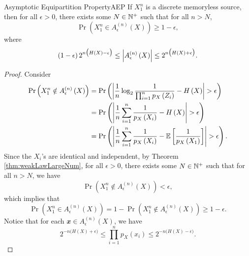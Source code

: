 \documentclass[math]{amznotes}
\theoremstyle{remark}
\begin{document}
\begin{thmbox}{Asymptotic Equipartition Property}{AEP}
    If $X_1^n$ is a discrete memoryless source, then for all $\epsilon > 0$, there exists some $N \in \mathbb{N}^+$ such that for all $n > N$, 
    \begin{equation*}
        \Pr\left(X_1^n \in A_{\epsilon}^{\left(n\right)}\left(X\right)\right) \geq 1 - \epsilon,
    \end{equation*}
    where 
    \begin{equation*}
        \left(1 - \epsilon\right)2^{n\bigl(H\left(X\right) - \epsilon\bigr)} \leq {\left\lvert {A_{\epsilon}^{\left(n\right)}\left(X\right)} \right\rvert} \leq 2^{n\bigl(H\left(X\right) + \epsilon\bigr)}.
    \end{equation*}
    \tcblower
    \begin{proof}
        Consider 
        \begin{align*}
            \Pr\left(X_1^n \notin A_{\epsilon}^{\left(n\right)}\left(X\right)\right) & = \Pr\left({\left\lvert {\frac{1}{n}\log_2\frac{1}{\prod_{i = 1}^np_X\left(Z_i\right)} - H\left(X\right)} \right\rvert} > \epsilon\right) \\
            & = \Pr\left({\left\lvert {\frac{1}{n}\sum_{i = 1}^{n}\frac{1}{p_X\left(X_i\right)} - H\left(X\right)} \right\rvert} > \epsilon\right) \\
            & = \Pr\left({\left\lvert {\frac{1}{n}\sum_{i = 1}^{n}\frac{1}{p_X\left(X_i\right)} - \mathbb{E}\left[\frac{1}{p_X\left(X_1\right)}\right]} \right\rvert} > \epsilon\right).
        \end{align*}
        Since the $X_i$'s are identical and independent, by Theorem \ref{thm:weakLawLargeNum}, for all $\epsilon > 0$, there exists some $N \in \mathbb{N}^+$ such that for all $n > N$, we have
        \begin{equation*}
            \Pr\left(X_1^n \notin A_{\epsilon}^{\left(n\right)}\left(X\right)\right) < \epsilon,
        \end{equation*}
        which implies that 
        \begin{equation*}
            \Pr\left(X_1^n \in A_{\epsilon}^{\left(n\right)}\left(X\right)\right) = 1 - \Pr\left(X_1^n \notin A_{\epsilon}^{\left(n\right)}\left(X\right)\right) \geq 1 - \epsilon.
        \end{equation*}
        Notice that for each $\mathbfit{x} \in A_{\epsilon}^{\left(n\right)}\left(X\right)$, we have 
        \begin{equation*}
            2^{-n\bigl(H\left(X\right) + \epsilon\bigr)} \leq \prod_{i = 1}^np_X\left(x_i\right) \leq 2^{-n\bigl(H\left(X\right) - \epsilon\bigr)}.

\end{equation*}
\end{proof}
\end{thmbox}
\end{document}
